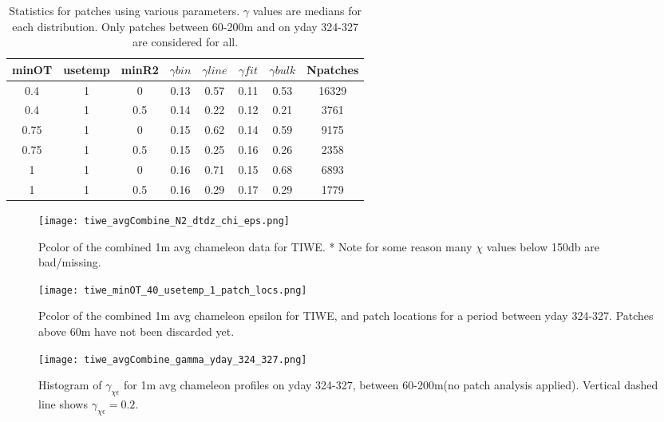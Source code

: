 \documentclass[11pt]{article}
\begin{document}
\begin{table}[htdp]
\caption{Statistics for patches using various parameters. $\gamma$ values are medians for each distribution. Only patches between 60-200m and on yday 324-327 are considered for all.}
\begin{center}
\begin{tabular}{|c|c|c|c|c|c|c|c|}
\hline
minOT & usetemp & minR2 & $\gamma bin$ & $\gamma line$ & $\gamma fit$ & $\gamma bulk$ & Npatches \\
\hline
0.4 & 1 & 0 & 0.13 & 0.57 & 0.11 & 0.53 & 16329 \\
\hline
0.4 & 1 & 0.5 & 0.14 & 0.22 & 0.12 & 0.21 & 3761 \\
\hline
0.75 & 1 & 0 & 0.15 & 0.62 & 0.14 & 0.59 & 9175 \\
\hline
0.75 & 1 & 0.5 & 0.15 & 0.25 & 0.16 & 0.26 & 2358 \\
\hline
1 & 1 & 0 & 0.16 & 0.71 & 0.15 & 0.68 & 6893 \\
\hline
1 & 1 & 0.5 & 0.16 & 0.29 & 0.17 & 0.29 & 1779 \\
\hline
\hline
\end{tabular}
\end{center}
\label{tab}
\end{table}%


\begin{figure}[htbp]
\texttt{[image: tiwe\_avgCombine\_N2\_dtdz\_chi\_eps.png]}
\caption{Pcolor of the combined 1m avg chameleon data for TIWE. * Note for some reason many $\chi$ values below 150db are bad/missing.}
\label{1mavgsum}
\end{figure}



\begin{figure}[htbp]
\texttt{[image: tiwe\_minOT\_40\_usetemp\_1\_patch\_locs.png]}
\caption{Pcolor of the combined 1m avg chameleon epsilon for TIWE, and patch locations for a period between yday 324-327. Patches above 60m have not been discarded yet.}
\label{patchlocs}
\end{figure}



\begin{figure}[htbp]
\texttt{[image: tiwe\_avgCombine\_gamma\_yday\_324\_327.png]}
\caption{Histogram of $\gamma_{\chi\epsilon}$ for 1m avg chameleon profiles on yday 324-327, between 60-200m(no patch analysis applied). Vertical dashed line shows $\gamma_{\chi\epsilon}=0.2$.}
\label{avggam}
\end{figure}
\end{document}
